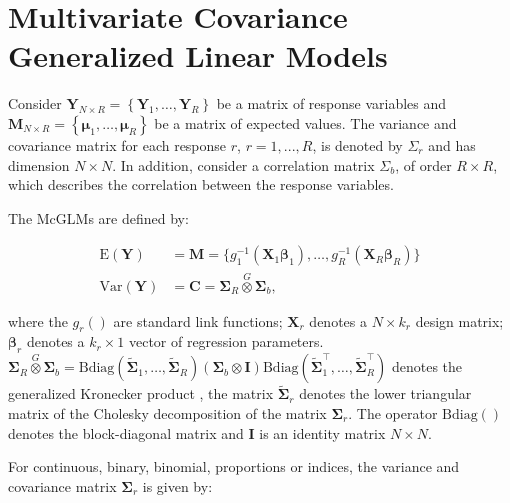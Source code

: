 \documentclass[AMA,STIX1COL]{WileyNJD-v2}
\begin{document}

\section{Multivariate Covariance Generalized Linear Models}\label{sec3}

Consider $\boldsymbol{Y}_{N \times R} = \left \{ \boldsymbol{Y}_1, \dots, \boldsymbol{Y}_R \right \}$ be a matrix of response variables and $\boldsymbol{ M}_{N \times R} = \left \{ \boldsymbol{\mu}_1, \dots, \boldsymbol{\mu}_R \right \}$ be a matrix of expected values. The variance and covariance matrix for each response $r$, $r = 1,..., R$, is denoted by $\Sigma_r$ and has dimension $N \times N$. In addition, consider a correlation matrix $\Sigma_b$, of order $R \times R$, which describes the correlation between the response variables.

The McGLMs \citep{Bonat16} are defined by:

$$
      \begin{aligned}
        \mathrm{E}(\boldsymbol{Y}) &=
          \boldsymbol{M} =
            \{g_1^{-1}(\boldsymbol{X}_1 \boldsymbol{\beta}_1),
            \ldots,
            g_R^{-1}(\boldsymbol{X}_R \boldsymbol{\beta}_R)\}
          \\
        \mathrm{Var}(\boldsymbol{Y}) &=
          \boldsymbol{C} =
            \boldsymbol{\Sigma}_R \overset{G} \otimes
            \boldsymbol{\Sigma}_b,
      \end{aligned}
$$

\noindent where the $g_r()$ are standard link functions; $\boldsymbol{X}_r$ denotes a $N \times k_r$ design matrix; $\boldsymbol{\beta}_r$ denotes a  $k_r \times 1$ vector of regression parameters. $\boldsymbol{\Sigma}_R \overset{G} \otimes \boldsymbol{\Sigma}_b = \mathrm{Bdiag}(\tilde{\boldsymbol{\Sigma}}_1, \ldots, \tilde{\boldsymbol{ \Sigma}}_R) (\boldsymbol{\Sigma}_b \otimes \boldsymbol{I}) \mathrm{Bdiag}(\tilde{\boldsymbol{\Sigma}}_1^\top, \ldots, \tilde{\boldsymbol{\Sigma}}_R^\top)$ denotes the generalized Kronecker product \cite{martinez13}, the matrix $\tilde{\boldsymbol{\Sigma}}_r$ denotes the lower triangular matrix of the Cholesky decomposition of the matrix ${\boldsymbol{\Sigma}}_r$. The operator $\mathrm{Bdiag()}$ denotes the block-diagonal matrix and $\boldsymbol{I}$ is an identity matrix $N \times N$.

For continuous, binary, binomial, proportions or indices, the variance and covariance matrix $\boldsymbol{\Sigma}_r$ is given by:
\end{document}
